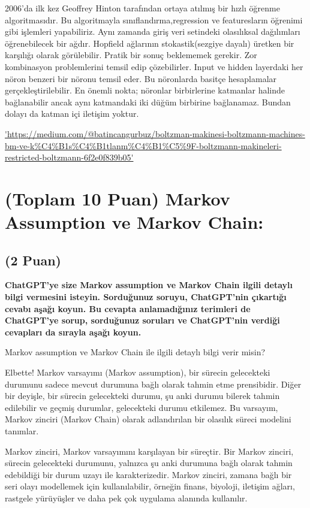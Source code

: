 \documentclass[11pt]{article}
\begin{document}
2006'da ilk kez Geoffrey Hinton tarafından ortaya atılmış bir hızlı öğrenme algoritmasıdır.
Bu algoritmayla sınıflandırma,regression ve featuresların öğrenimi gibi işlemleri yapabiliriz. Aynı zamanda giriş veri setindeki olasılıksal dağılımları öğrenebilecek bir ağdır. Hopfield ağlarının stokastik(sezgiye dayalı) üretken bir karşılığı olarak görülebilir. Pratik bir sonuç beklememek gerekir. Zor kombinasyon problemlerini temsil edip çözebilirler. Input ve hidden layerdaki her nöron benzeri bir nöronu temsil eder. Bu nöronlarda basitçe hesaplamalar gerçekleştirilebilir. En önemli nokta; nöronlar birbirlerine katmanlar halinde bağlanabilir ancak aynı katmandaki iki düğüm birbirine bağlanamaz. Bundan dolayı da katman içi iletişim yoktur.

\url{'https://medium.com/@batincangurbuz/boltzman-makinesi-boltzmann-machines-bm-ve-k%C4%B1s%C4%B1tlanm%C4%B1%C5%9F-boltzmann-makineleri-restricted-boltzmann-6f2e0f839b05'}

\section{(Toplam 10 Puan) Markov Assumption ve Markov Chain:}

\subsection{(2 Puan)} \textbf{ChatGPT’ye size Markov assumption ve Markov Chain ilgili detaylı bilgi vermesini isteyin. Sorduğunuz soruyu, ChatGPT'nin çıkartığı cevabı aşağı koyun. Bu cevapta anlamadığınız terimleri de ChatGPT’ye sorup, sorduğunuz soruları ve ChatGPT’nin verdiği cevapları da sırayla aşağı koyun.}

Markov assumption ve Markov Chain ile ilgili detaylı bilgi verir misin?

Elbette! Markov varsayımı (Markov assumption), bir sürecin gelecekteki durumunu sadece mevcut durumuna bağlı olarak tahmin etme prensibidir. Diğer bir deyişle, bir sürecin gelecekteki durumu, şu anki durumu bilerek tahmin edilebilir ve geçmiş durumlar, gelecekteki durumu etkilemez. Bu varsayım, Markov zinciri (Markov Chain) olarak adlandırılan bir olasılık süreci modelini tanımlar.

Markov zinciri, Markov varsayımını karşılayan bir süreçtir. Bir Markov zinciri, sürecin gelecekteki durumunu, yalnızca şu anki durumuna bağlı olarak tahmin edebildiği bir durum uzayı ile karakterizedir. Markov zinciri, zamana bağlı bir seri olayı modellemek için kullanılabilir, örneğin finans, biyoloji, iletişim ağları, rastgele yürüyüşler ve daha pek çok uygulama alanında kullanılır.
\end{document}
